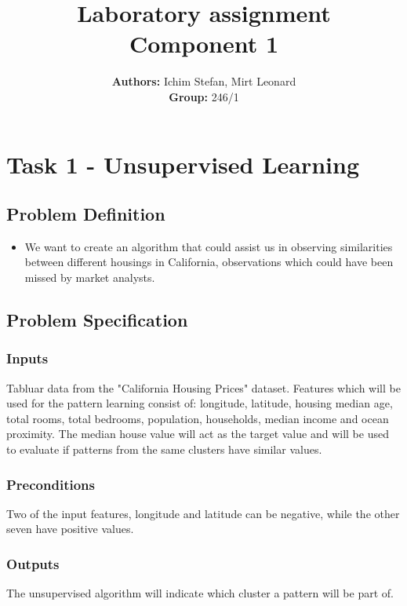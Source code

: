 \documentclass[a4paper, 11pt]{article}
\title{\textbf{Laboratory assignment} \\[1ex] \large \textbf{Component} {1}}
\author{\textbf{Authors:} {Ichim Stefan, Mirt Leonard}\\ \textbf{Group:} {246/1}}
\begin{document}
\maketitle

\section{Task 1 - Unsupervised Learning}

\subsection{Problem Definition}

\begin{itemize}
  \item{
    We want to create an algorithm that could assist us in 
    observing similarities between different housings in California,
    observations which could have been missed by market analysts.
  }
\end{itemize}

\subsection{Problem Specification}

\subsubsection*{Inputs} 
  Tabluar data from the "California Housing Prices" dataset.
  Features which will be used for the pattern learning
  consist of: longitude, latitude, housing median age, total rooms,
  total bedrooms, population, households, median income and ocean 
  proximity. The median house value will act as the target value 
  and will be used to evaluate if patterns from the same clusters
  have similar values.

\subsubsection*{Preconditions} 
Two of the input features, longitude and latitude can be negative, while the other seven have positive values.

\subsubsection*{Outputs} 
  The unsupervised algorithm will indicate which cluster a pattern
  will be part of.
  
\end{document}

